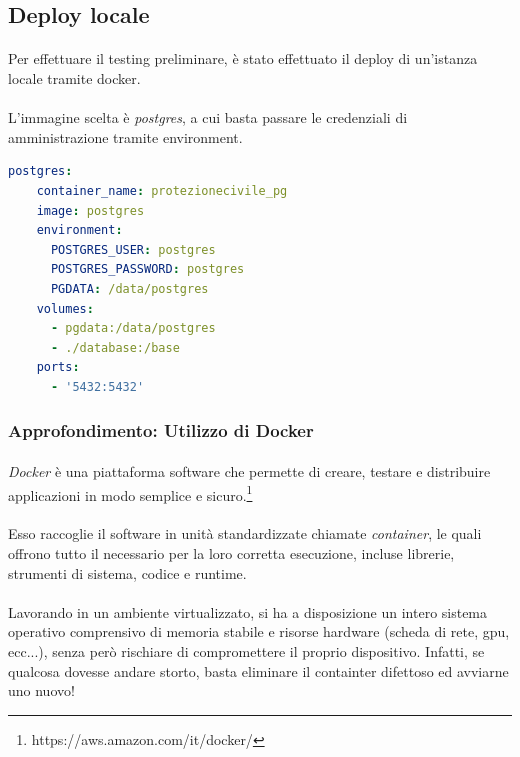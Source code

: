 \documentclass[11pt,a4paper,english]{article}
\begin{document}
\subsection{Deploy locale}

\paragraph{} Per effettuare il testing preliminare, è stato effettuato il deploy di un'istanza locale tramite docker. 

\paragraph{} L'immagine scelta è \emph{postgres}, a cui basta passare le credenziali di amministrazione tramite environment. 

\begin{lstlisting}[language=YAML, caption=Configurazione di docker compose per postgres]
postgres:
    container_name: protezionecivile_pg
    image: postgres
    environment:
      POSTGRES_USER: postgres
      POSTGRES_PASSWORD: postgres
      PGDATA: /data/postgres
    volumes:
      - pgdata:/data/postgres
      - ./database:/base
    ports:
      - '5432:5432'
\end{lstlisting}


\subsubsection{Approfondimento: Utilizzo di Docker}

\paragraph{} \emph{Docker} \cite{docker} è una piattaforma software che permette di creare, testare e distribuire applicazioni in modo semplice e sicuro.\footnote{https://aws.amazon.com/it/docker/} 

\paragraph{} Esso raccoglie il software in unità standardizzate chiamate \emph{container}, le quali offrono tutto il necessario per la loro corretta esecuzione, incluse librerie, strumenti di sistema, codice e runtime. 

\paragraph{} Lavorando in un ambiente virtualizzato, si ha a disposizione un intero sistema operativo comprensivo di memoria stabile e risorse hardware (scheda di rete, gpu, ecc...), senza però rischiare di compromettere il proprio dispositivo. Infatti, se qualcosa dovesse andare storto, basta eliminare il containter difettoso ed avviarne uno nuovo!
\end{document}
